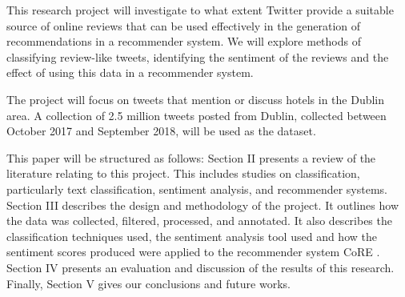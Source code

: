 This research project will investigate to what extent Twitter provide a suitable source of online reviews that can be used effectively in the generation of recommendations in a recommender system. We will explore methods of classifying review-like tweets, identifying the sentiment of the reviews and the effect of using this data in a recommender system.

The project will focus on tweets that mention or discuss hotels in the Dublin area. A collection of 2.5 million tweets posted from Dublin, collected between October 2017 and September 2018, will be used as the dataset. 

This paper will be structured as follows: Section II presents a review of the literature relating to this project. This includes studies on classification, particularly text classification, sentiment analysis, and recommender systems. Section III describes the design and methodology of the project. It outlines how the data was collected, filtered, processed, and annotated. It also describes the classification techniques used, the sentiment analysis tool used and how the sentiment scores produced were applied to the recommender system CoRE \cite{core2019}. Section IV presents an evaluation and discussion of the results of this research. Finally, Section V gives our conclusions and future works.